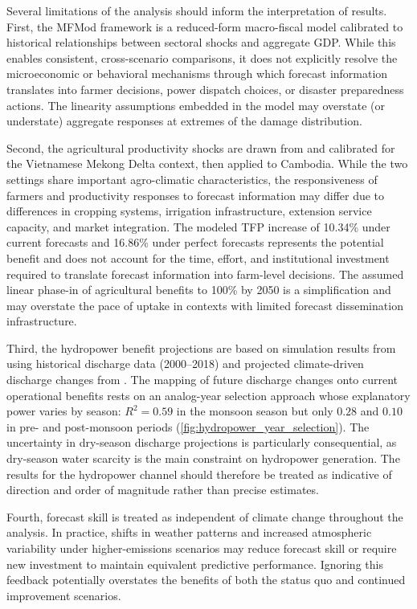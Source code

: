 \documentclass[
  final,
  10pt,
  letterpaper,
  english,
]{article}
\begin{document}
Several limitations of the analysis should inform the interpretation of results.
First, the MFMod framework is a reduced-form macro-fiscal model calibrated to
historical relationships between sectoral shocks and aggregate GDP. While this
enables consistent, cross-scenario comparisons, it does not explicitly resolve
the microeconomic or behavioral mechanisms through which forecast information
translates into farmer decisions, power dispatch choices, or disaster
preparedness actions. The linearity assumptions embedded in the model may
overstate (or understate) aggregate responses at extremes of the damage
distribution.

Second, the agricultural productivity shocks are drawn from \textcite{an-vo_framework_2021}
and calibrated for the Vietnamese Mekong Delta context, then applied to
Cambodia. While the two settings share important agro-climatic characteristics,
the responsiveness of farmers and productivity responses to forecast information may differ due to differences in
cropping systems, irrigation infrastructure, extension service capacity, and
market integration. The modeled TFP increase of 10.34\% under current forecasts and
16.86\% under perfect forecasts represents the potential benefit and does not
account for the time, effort, and institutional investment required to translate
forecast information into farm-level decisions. The assumed linear phase-in of
agricultural benefits to 100\% by 2050 is a simplification and may overstate the
pace of uptake in contexts with limited forecast dissemination infrastructure.

Third, the hydropower benefit projections are based on simulation results from
\textcite{koh_evaluating_2024} using historical discharge data (2000--2018) and
projected climate-driven discharge changes from \textcite{wang2024historical}.
The mapping of future discharge changes onto current operational benefits rests
on an analog-year selection approach whose explanatory power varies by season:
$R^2 = 0.59$ in the monsoon season but only $0.28$ and $0.10$ in pre- and post-monsoon
periods (\cref{fig:hydropower_year_selection}). The uncertainty in dry-season
discharge projections is particularly consequential, as dry-season water
scarcity is the main constraint on hydropower generation. The results for the
hydropower channel should therefore be treated as indicative of direction and
order of magnitude rather than precise estimates.

Fourth, forecast skill is treated as independent of climate change throughout
the analysis. In practice, shifts in weather patterns and increased atmospheric
variability under higher-emissions scenarios may reduce forecast skill or
require new investment to maintain equivalent predictive performance. Ignoring
this feedback potentially overstates the benefits of both the status quo and
continued improvement scenarios.
\end{document}
